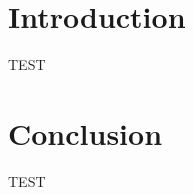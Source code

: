 

\begin{frame}
      \maketitle
\end{frame}

\begin{frame}
      \tableofcontents
\end{frame}

\section{Introduction}

\begin{frame}
      TEST
\end{frame}

\section{Conclusion}

\begin{frame}
      TEST
\end{frame}



\endinput

